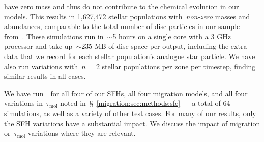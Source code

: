 have zero mass and thus do not contribute to the chemical evolution in our 
models. 
This results in 1,627,472 stellar populations with~\textit{non-zero} masses and 
abundances, comparable to the total number of disc particles in our sample 
from~\hsim. 
These simulations run in~$\sim$5 hours on a single core with a 3 GHz 
processor and take up~$\sim$235 MB of disc space per output, including the 
extra data that we record for each stellar population's analogue star particle. 
We have also run variations with~$n$ = 2 stellar populations per 
zone per timestep, finding similar results in all cases. 
\par 
We have run~\vice~for all four of our SFHs, all four migration 
models, and all four variations in~$\tau_\text{mol}$ noted 
in~\S~\ref{migration:sec:methods:sfe} --- a total of 64 simulations, as well as a variety 
of other test cases. 
For many of our results, only the SFH variations have a substantial impact. 
We discuss the impact of migration or~$\tau_\text{mol}$ variations where they 
are relevant. 

